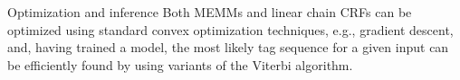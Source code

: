 \documentclass[style=upen, size=14pt]{powerdot}
\theoremstyle{definition}
\begin{document}
  \begin{slide}[toc={Optimization and inference}]{Optimization and inference}
    Both MEMMs and linear chain CRFs can be optimized using standard convex
    optimization techniques, e.g., gradient descent, and, having trained a
    model, the most likely tag sequence for a given input can be efficiently
    found by using variants of the Viterbi algorithm.
  \end{slide}
\end{document}
